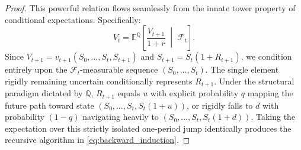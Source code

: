 \begin{proof}
    This powerful relation flows seamlessly from the innate tower property of conditional expectations. Specifically:
    \begin{equation}
        V_t = \mathbb{E}^\mathbb{Q} \left[ \frac{V_{t+1}}{1+r} \;\middle|\; \mathcal{F}_t \right].
    \end{equation}
    Since $V_{t+1} = v_{t+1}(S_0, \dots, S_t, S_{t+1})$ and $S_{t+1} = S_t(1+R_{t+1})$, we condition entirely upon the $\mathcal{F}_t$-measurable sequence $(S_0, \dots, S_t)$. The single element rigidly remaining uncertain conditionally represents $R_{t+1}$. Under the structural paradigm dictated by $\mathbb{Q}$, $R_{t+1}$ equals $u$ with explicit probability $q$ mapping the future path toward state $(S_0, \dots, S_t, S_t(1+u))$, or rigidly falls to $d$ with probability $(1-q)$ navigating heavily to $(S_0, \dots, S_t, S_t(1+d))$. Taking the expectation over this strictly isolated one-period jump identically produces the recursive algorithm in \eqref{eq:backward_induction}.
\end{proof}
